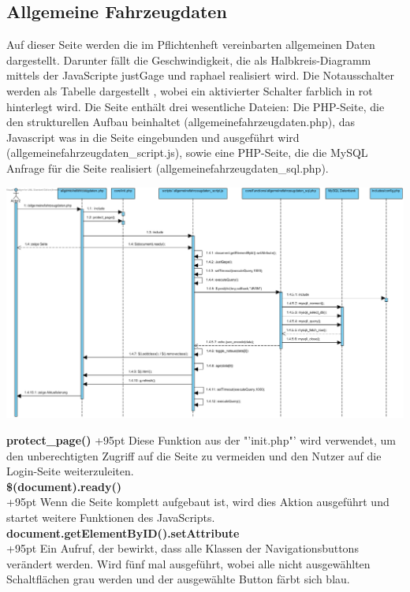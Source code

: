 \documentclass[fontsize = 12pt, paper = a4]{scrreprt}
\begin{document}
\subsection{Allgemeine Fahrzeugdaten}
Auf dieser Seite werden die im Pflichtenheft vereinbarten allgemeinen Daten dargestellt. Darunter fällt die Geschwindigkeit, die als Halbkreis-Diagramm mittels der JavaScripte justGage und raphael realisiert wird. Die Notausschalter werden als Tabelle dargestellt , wobei ein aktivierter Schalter farblich in rot hinterlegt wird. Die Seite enthält drei wesentliche Dateien: Die PHP-Seite, die den strukturellen Aufbau beinhaltet (allgemeinefahrzeugdaten.php), das Javascript was in die Seite eingebunden und ausgeführt wird (allgemeinefahrzeugdaten\_script.js), sowie eine PHP-Seite, die die MySQL Anfrage für die Seite realisiert (allgemeinefahrzeugdaten\_sql.php). 

\includegraphics[scale=0.452]{allgemeinefahrzeugdaten.png}


\textbf{protect\_page()}
\hspace{0.5mm}
\hangindent+95pt  Diese Funktion aus der "'init.php"' wird verwendet, um den unberechtigten Zugriff auf die Seite zu vermeiden und den Nutzer auf die Login-Seite weiterzuleiten.\\


\textbf{\$(document).ready()}\\
\hangindent+95pt  
Wenn die Seite komplett aufgebaut ist, wird dies Aktion ausgeführt und startet weitere Funktionen des JavaScripts. \\


\textbf{document.getElementByID().setAttribute}\\
\hangindent+95pt   
Ein Aufruf, der bewirkt, dass alle Klassen der Navigationsbuttons verändert werden. Wird fünf mal ausgeführt, wobei alle nicht ausgewählten Schaltflächen grau werden und der ausgewählte Button färbt sich blau. \\
\end{document}
